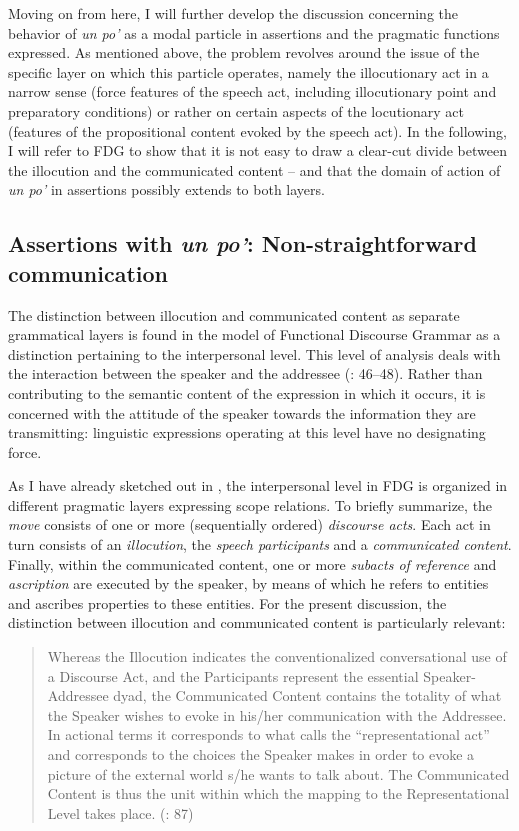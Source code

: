 Moving on from here, I will further develop the discussion concerning the behavior of \textit{un po’} as a modal particle in assertions and the pragmatic functions expressed. As mentioned above, the problem revolves around the issue of the specific layer on which this particle operates, namely the illocutionary act in a narrow sense (force features of the speech act, including illocutionary point and preparatory conditions) or rather on certain aspects of the locutionary act (features of the propositional content evoked by the speech act). In the following, I will refer to FDG to show that it is not easy to draw a clear-cut divide between the illocution and the communicated content – and that the domain of action of \textit{un po’} in assertions possibly extends to both layers.

\subsection{Assertions with \textit{un po’}: Non-straightforward communication}
\hypertarget{Toc124860665}{}
The distinction between illocution and communicated content as separate grammatical layers is found in the model of Functional Discourse Grammar as a distinction pertaining to the interpersonal level. This level of analysis deals with the interaction between the speaker and the addressee (\citealt{HengeveldMackenzie2008}: 46–48). Rather than contributing to the semantic content of the expression in which it occurs, it is concerned with the attitude of the speaker towards the information they are transmitting: linguistic expressions operating at this level have no designating force.

As I have already sketched out in , the interpersonal level in FDG is organized in different pragmatic layers expressing scope relations. To briefly summarize, the \textit{move} consists of one or more (sequentially ordered) \textit{discourse acts}. Each act in turn consists of an \textit{illocution}, the \textit{speech participants} and a \textit{communicated content}. Finally, within the communicated content, one or more \textit{subacts of reference} and \textit{ascription} are executed by the speaker, by means of which he refers to entities and ascribes properties to these entities. For the present discussion, the distinction between illocution and communicated content is particularly relevant:

\begin{quote}
Whereas the Illocution indicates the conventionalized conversational use of a Discourse Act, and the Participants represent the essential Speaker-Addressee dyad, the Communicated Content contains the totality of what the Speaker wishes to evoke in his/her communication with the Addressee. In actional terms it corresponds to what \citet{Searle1969} calls the “representational act” and corresponds to the choices the Speaker makes in order to evoke a picture of the external world s/he wants to talk about. The Communicated Content is thus the unit within which the mapping to the Representational Level takes place. (\citealt{HengeveldMackenzie2008}: 87)
\end{quote}

